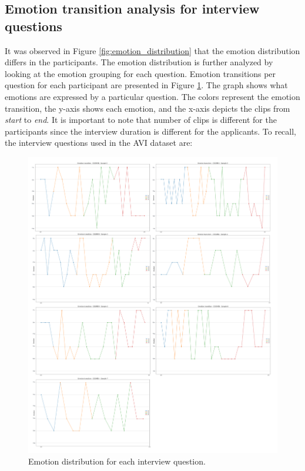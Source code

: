 \subsection{Emotion transition analysis for interview questions}
It was observed in Figure \ref{fig:emotion_distribution} that the emotion distribution differs in the participants. The emotion distribution is further analyzed by looking at the emotion grouping for each question. Emotion transitions per question for each participant are presented in Figure \ref{fig:emotion_transition_questions}. The graph shows what emotions are expressed by a particular question. The colors represent the emotion transition, the y-axis shows each emotion, and the x-axis depicts the clips from \textit{start} to \textit{end}. It is important to note that number of clips is different for the participants since the interview duration is different for the applicants. To recall, the interview questions used in the AVI dataset are:
%
\begin{figure}[h]
  \centering
  \includegraphics[width=\textwidth]{figures/emotion_transition_questions.png}
  \caption{Emotion distribution for each interview question.}
  \label{fig:emotion_transition_questions}
\end{figure}
